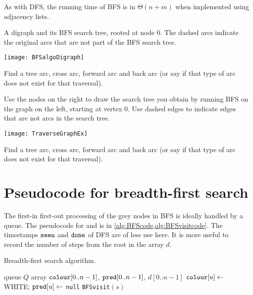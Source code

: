 As with DFS, the running time of BFS is in $\Theta(n+m)$ when implemented using adjacency lists.

\begin{Boxample}[4]
A digraph and its BFS search tree, rooted at node $0$. 
The dashed arcs indicate the original arcs that are not part of the BFS search tree.
\begin{center}
  \texttt{[image: BFSalgoDigraph]} 
\end{center}
Find a tree arc, cross arc, forward arc and back arc (or say if that type of arc does not exist for that traversal).
\end{Boxample}

\begin{Boxample}[2]
Use the nodes on the right to draw the search tree you obtain by running BFS on the graph on the left, starting at vertex $0$. 
Use dashed edges to indicate edges that are not arcs in the search tree.
\begin{center}
  \texttt{[image: TraverseGraphEx]}
\end{center}
Find a tree arc, cross arc, forward arc and back arc (or say if that type of arc does not exist for that traversal).
\end{Boxample}
 
\section{Pseudocode for breadth-first search} \label{sec:bfs}
The first-in first-out processing of the grey nodes in BFS is ideally handled by a queue. 
The pseudocode for  and  is in \cref{alg:BFScode,alg:BFSvisitcode}.
The timestamps $\operatorname{\text{\texttt{seen}}}$ and $\operatorname{\text{\texttt{done}}}$ of DFS are of less use here. 
It is more useful to record the number of steps from the root in the array $d$.

\begin{algorithm}[H]
  \caption{Breadth-first search algorithm.}
    \label{alg:BFScode}
\begin{algorithmic}[1]
	\State queue $Q$  
	\State array $\operatorname{\text{\texttt{colour}}}[0..n-1]$, $\operatorname{\text{\texttt{pred}}}[0..n-1]$, $d[0..n-1]$
		\State $\operatorname{\text{\texttt{colour}}}[u] \gets $ WHITE; $\operatorname{\text{\texttt{pred}}}[u] \gets $ \texttt{null}
	\EndFor
			\State \texttt{BFSvisit}$(s)$
		\EndIf
	\EndFor
	\State {}
\EndFunction
\end{algorithmic}
\end{algorithm}

